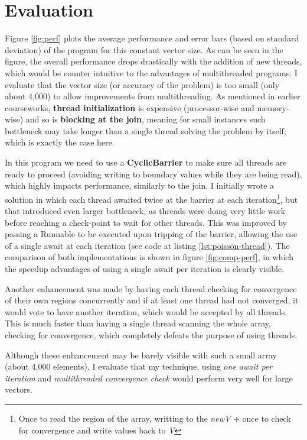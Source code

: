 \documentclass{article}
\begin{document}
\section{Evaluation}

Figure \ref{fig:perf} plots the average performance and error bars (based on standard deviation) of the program for this constant vector size. As can be seen in the figure, the overall performance drops drastically with the addition of new threads, which would be counter intuitive to the advantages of multithreaded programs. I evaluate that the vector size (or accuracy of the problem) is too small (only about 4,000) to allow improvements from multithreading. As mentioned in earlier courseworks, \textbf{thread initialization} is expensive (processor-wise and memory-wise) and so is \textbf{blocking at the join}, meaning for small instances such bottleneck may take longer than a single thread solving the problem by itself, which is exactly the case here.

In this program we need to use a \textbf{CyclicBarrier} to make sure all threads are ready to proceed (avoiding writing to boundary values while they are being read), which highly impacts performance, similarly to the join. I initially wrote a solution in which each thread awaited twice at the barrier at each iteration\footnote{\label{awaittwice} Once to read the region of the array, writting to the \textit{newV} + once to check for convergence and write values back to \textit{V}}, but that introduced even larger bottleneck, as threads were doing very little work before reaching a check-point to wait for other threads. This was improved by passing a Runnable to be executed upon tripping of the barrier, allowing the use of a single await at each iteration (see code at listing \ref{lst:poisson-thread}). The comparison of both implementations is shown in figure \ref{fig:comp-perf}, in which the speedup advantages of using a single await per iteration is clearly visible.

Another enhancement was made by having each thread checking for convergence of their own regions concurrently and if at least one thread had not converged, it would vote to have another iteration, which would be accepted by all threads. This is much faster than having a single thread scanning the whole array, checking for convergence, which completely defeats the purpose of using threads.

Although these enhancement may be barely visible with such a small array (about 4,000 elements), I evaluate that my technique, using \textit{one await per iteration} and \textit{multithreaded convergence check} would perform very well for large vectors.
\end{document}
